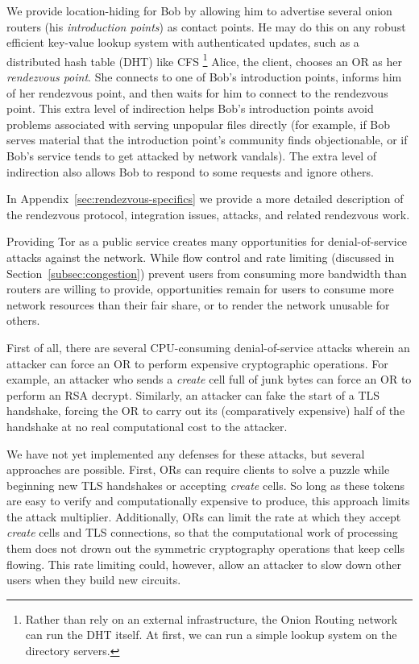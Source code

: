 \documentclass[times,10pt,twocolumn]{article}
\begin{document}
We provide location-hiding for Bob by allowing him to advertise
several onion routers (his \emph{introduction points}) as contact
points. He may do this on any robust efficient
key-value lookup system with authenticated updates, such as a
distributed hash table (DHT) like CFS \cite{cfs:sosp01}\footnote{
Rather than rely on an external infrastructure, the Onion Routing network
can run the DHT itself.  At first, we can run a simple lookup
system on the
directory servers.} Alice, the client, chooses an OR as her
\emph{rendezvous point}. She connects to one of Bob's introduction
points, informs him of her rendezvous point, and then waits for him
to connect to the rendezvous point. This extra level of indirection
helps Bob's introduction points avoid problems associated with serving
unpopular files directly (for example, if Bob serves
material that the introduction point's community finds objectionable,
or if Bob's service tends to get attacked by network vandals).
The extra level of indirection also allows Bob to respond to some requests
and ignore others.

In Appendix~\ref{sec:rendezvous-specifics} we provide a more detailed
description of the rendezvous protocol, integration issues, attacks,
and related rendezvous work.

\label{sec:other-design}

\label{subsec:dos}

Providing Tor as a public service creates many opportunities for
denial-of-service attacks against the network.  While
flow control and rate limiting (discussed in
Section~\ref{subsec:congestion}) prevent users from consuming more
bandwidth than routers are willing to provide, opportunities remain for
users to
consume more network resources than their fair share, or to render the
network unusable for others.

First of all, there are several CPU-consuming denial-of-service
attacks wherein an attacker can force an OR to perform expensive
cryptographic operations.  For example, an attacker who sends a
\emph{create} cell full of junk bytes can force an OR to perform an RSA
decrypt.  Similarly, an attacker can
fake the start of a TLS handshake, forcing the OR to carry out its
(comparatively expensive) half of the handshake at no real computational
cost to the attacker.

We have not yet implemented any defenses for these attacks, but several
approaches are possible. First, ORs can
require clients to solve a puzzle \cite{puzzles-tls} while beginning new
TLS handshakes or accepting \emph{create} cells.  So long as these
tokens are easy to verify and computationally expensive to produce, this
approach limits the attack multiplier.  Additionally, ORs can limit
the rate at which they accept \emph{create} cells and TLS connections,
so that
the computational work of processing them does not drown out the
symmetric cryptography operations that keep cells
flowing.  This rate limiting could, however, allow an attacker
to slow down other users when they build new circuits.
\end{document}
